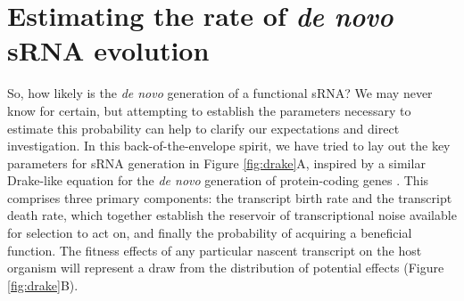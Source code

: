 \section{Estimating the rate of \textit{de novo} sRNA evolution}

So, how likely is the \textit{de novo} generation of a functional sRNA? We may never know for certain, but attempting to establish the parameters necessary to estimate this probability can help to clarify our expectations and direct investigation. In this back-of-the-envelope spirit, we have tried to lay out the key parameters for sRNA generation in Figure \ref{fig:drake}A, inspired by a similar Drake-like equation for the \textit{de novo} generation of protein-coding genes \citep{Weisman2017-gm}. This comprises three primary components: the transcript birth rate and the transcript death rate, which together establish the reservoir of transcriptional noise available for selection to act on,  and finally the probability of acquiring a beneficial function. The fitness effects of any particular nascent transcript on the host organism will represent a draw from the distribution of potential effects (Figure \ref{fig:drake}B). \par

